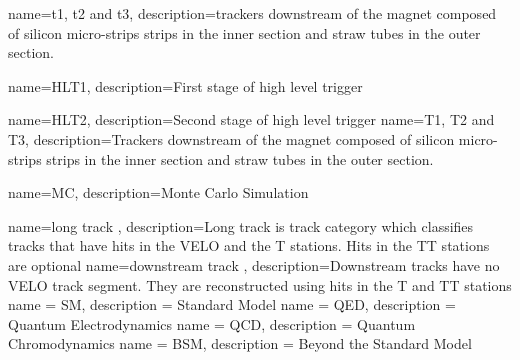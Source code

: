 {
	name=t1{,} t2 and t3,
		description={trackers downstream of the magnet composed of silicon micro-strips strips in the inner section and straw tubes in the outer section.}
}

{
	name=HLT1,
		description={First stage of high level trigger}
}

{
	name=HLT2,
		description={Second stage of high level trigger}
}
{
	name=T1{,} T2 and T3,
		description={Trackers downstream of the magnet composed of silicon micro-strips strips in the inner section and straw tubes in the outer section.}
}

{
	name=MC,
		description={Monte Carlo Simulation}
}

{
	name=long track ,
		description={Long track is track category which classifies tracks that have hits in the VELO and the T stations. Hits in the TT stations are optional}
}
{
	name=downstream track ,
		description={Downstream tracks have no VELO track segment. They are reconstructed using hits in the T and TT stations}
}
{      
	name = SM,
	     description = {Standard Model}     
}
{      
	name = QED,
	     description = {Quantum Electrodynamics}     
}
{      
	name = QCD,
	     description = {Quantum Chromodynamics}     
}
{      
	name = BSM,
	     description = {Beyond the Standard Model}     
}

